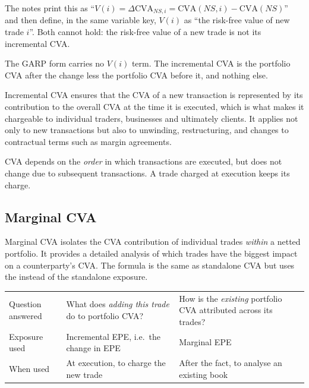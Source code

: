 \begin{crtrapbox}
The notes print this as ``$V(i) = \Delta\mathrm{CVA}_{NS,i} = \mathrm{CVA}(NS,i)
- \mathrm{CVA}(NS)$'' and then define, in the same variable key, $V(i)$ as ``the
risk-free value of new trade $i$''. Both cannot hold: the risk-free value of a new
trade is not its incremental CVA.

\smallskip
The GARP form carries no $V(i)$ term. The incremental CVA is the portfolio CVA
after the change less the portfolio CVA before it, and nothing else.
\end{crtrapbox}

Incremental CVA ensures that the CVA of a new transaction is represented by its
contribution to the overall CVA at the time it is executed, which is what makes it
chargeable to individual traders, businesses and ultimately clients. It applies
not only to new transactions but also to unwinding, restructuring, and changes to
contractual terms such as margin agreements.

\begin{crkeybox}
CVA depends on the \emph{order} in which transactions are executed, but does not
change due to subsequent transactions. A trade charged at execution keeps its
charge.
\end{crkeybox}

\subsection*{Marginal CVA}

Marginal CVA isolates the CVA contribution of individual trades \emph{within} a
netted portfolio. It provides a detailed analysis of which trades have the biggest
impact on a counterparty's CVA. The formula is the same as standalone CVA but uses
the  instead of the standalone exposure.

\begin{center}
\footnotesize
\begin{tabular}{L{2.8cm} L{5.7cm} L{6.0cm}}
\toprule
 &  &  \\
\midrule
Question answered & What does \emph{adding this trade} do to portfolio CVA? &
  How is the \emph{existing} portfolio CVA attributed across its trades? \\
Exposure used & Incremental EPE, i.e.\ the change in EPE &
  Marginal EPE \\
When used & At execution, to charge the new trade &
  After the fact, to analyse an existing book \\
\bottomrule
\end{tabular}
\end{center}

